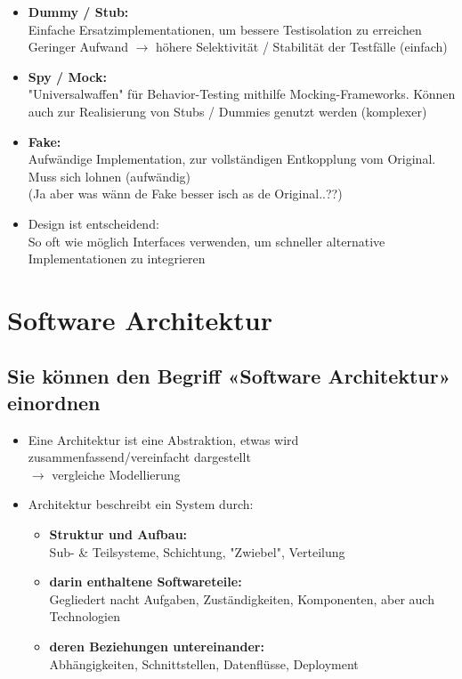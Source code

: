 \documentclass[a4paper]{article}
\begin{document}
			\begin{itemize}
				\item \textbf{Dummy / Stub:}\\
				Einfache Ersatzimplementationen, um bessere Testisolation zu erreichen\\
				Geringer Aufwand $\rightarrow$ höhere Selektivität / Stabilität der Testfälle (einfach)
				
				\item \textbf{Spy / Mock:}\\
				"Universalwaffen" für Behavior-Testing mithilfe Mocking-Frameworks.
				Können auch zur Realisierung von Stubs / Dummies genutzt werden (komplexer)
				
				\item \textbf{Fake:}\\
				Aufwändige Implementation, zur vollständigen Entkopplung vom Original.\\
				Muss sich lohnen (aufwändig)\\
				(Ja aber was wänn de Fake besser isch as de Original..??)\\
				
				\item Design ist entscheidend:\\
				So oft wie möglich Interfaces verwenden, um schneller alternative Implementationen zu integrieren
			\end{itemize}
				
	\newpage
	\section{Software Architektur}
		
		\subsection{Sie können den Begriff «Software Architektur» einordnen}
		
		\begin{itemize}
			\item Eine Architektur ist eine Abstraktion, etwas wird zusammenfassend/vereinfacht dargestellt\\
			$\rightarrow$ vergleiche Modellierung
			\item Architektur beschreibt ein System durch:
				\begin{itemize}
					\item \textbf{Struktur und Aufbau:}\\
							Sub- \& Teilsysteme, Schichtung, "Zwiebel", Verteilung
					\item \textbf{darin enthaltene Softwareteile:}\\
							Gegliedert nacht Aufgaben, Zuständigkeiten, Komponenten, aber auch Technologien
					\item \textbf{deren Beziehungen untereinander:}\\
							Abhängigkeiten, Schnittstellen, Datenflüsse, Deployment
				\end{itemize}
		\end{itemize}
	
\end{document}
